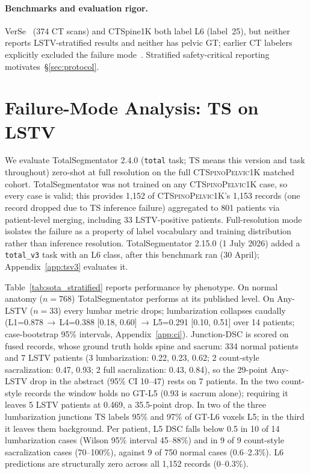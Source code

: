 \documentclass{article}
\newcommand{\dataset}{\textsc{CTSpinoPelvic1K}}
\newcommand{\TS}{TotalSegmentator}
\newcommand{\SOTA}{TotalSegmentator}
\newcommand{\sota}{TS}
\newcommand{\VerSe}{VerSe}
\begin{document}
\paragraph{Benchmarks and evaluation rigor.}
\VerSe{}~\citep{Sekuboyina2021VerSe:Images} (374 CT scans)
and CTSpine1K both label L6 (label~25), but neither
reports LSTV-stratified results and neither has pelvic GT; earlier CT labelers explicitly excluded
the failure mode~\citep{Sekuboyina2020LabelingAnatomy}.
Stratified safety-critical
reporting~\citep{Maier-Hein2024MetricsValidation}
motivates~\S\ref{sec:protocol}.

\section{Failure-Mode Analysis: \sota{} on LSTV}
\label{sec:audit}

We evaluate \SOTA{} 2.4.0 (\texttt{total} task; \sota{}
means this version and task throughout) zero-shot at
full resolution on the full \dataset{} matched cohort.
\SOTA{} was not trained on any \dataset{} case, so every
case is valid; this provides 1{,}152 of \dataset{}'s
1{,}153 records (one record dropped due to \sota{}
inference failure) aggregated to 801 patients via
patient-level merging, including 33 LSTV-positive
patients. Full-resolution mode isolates the failure as a
property of label vocabulary and training distribution
rather than inference resolution. \TS{} 2.15.0 (1 July
2026) added a \texttt{total\_v3} task with an L6 class,
after this benchmark ran (30 April);
Appendix~\ref{app:tsv3} evaluates it.

Table~\ref{tab:sota_stratified} reports performance by
phenotype. On normal anatomy ($n{=}768$) \SOTA{} performs at
its published level. On Any-LSTV ($n{=}33$) every lumbar
metric drops; lumbarization collapses caudally
(L1=0.878\,$\to$\,L4=0.388 [0.18, 0.60]\,$\to$\,L5=0.291
[0.10, 0.51] over 14 patients; case-bootstrap 95\%
intervals, Appendix~\ref{app:ci}). Junction-DSC is scored on fused records, whose
ground truth holds spine and sacrum: 334 normal patients
and 7 LSTV patients (3 lumbarization: 0.22, 0.23, 0.62; 2
count-style sacralization: 0.47, 0.93; 2 full
sacralization: 0.43, 0.84), so the 29-point Any-LSTV drop
in the abstract (95\% CI 10--47) rests on 7 patients. In the two
count-style records the window holds no GT-L5 (0.93 is
sacrum alone); requiring it leaves 5 LSTV patients at
0.469, a 35.5-point drop. In two of the three
lumbarization junctions \sota{} labels 95\% and 97\% of
GT-L6 voxels L5; in the third it leaves them background.
Per patient, L5 DSC
falls below 0.5 in 10 of 14 lumbarization cases (Wilson
95\% interval 45--88\%) and in 9 of 9 count-style
sacralization cases (70--100\%), against 9 of 750 normal
cases (0.6--2.3\%). \textsc{L6} predictions are
structurally zero across all 1{,}152 records (0--0.3\%).
\end{document}
